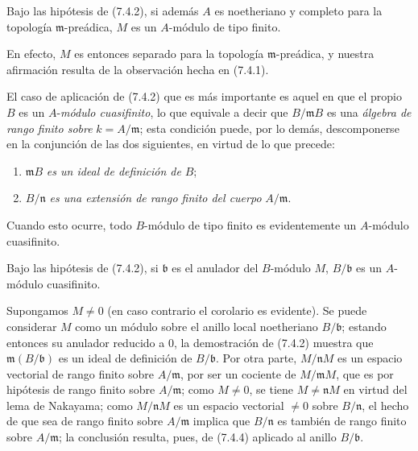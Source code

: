 \begin{corollary}[7.4.3]
\label{0.7.4.3-fr}
Bajo las hipótesis de \textup{(7.4.2)}, si además $A$ es noetheriano y completo para
la topología $\mathfrak m$-preádica, $M$ es un $A$-módulo de tipo finito.
\end{corollary}

En efecto, $M$ es entonces separado para la topología $\mathfrak m$-preádica, y
nuestra afirmación resulta de la observación hecha en (7.4.1).

\begin{env}[7.4.4]
\label{0.7.4.4-fr}
El caso de aplicación de (7.4.2) que es más importante es aquel en que el propio $B$
es un $A$-\emph{módulo cuasifinito}, lo que equivale a decir que
$B/\mathfrak mB$ es una \emph{álgebra de rango finito sobre}
$k=A/\mathfrak m$; esta condición puede, por lo demás, descomponerse en la
conjunción de las dos siguientes, en virtud de lo que precede:
\begin{enumerate}
  \item[(i)] $\mathfrak mB$ \emph{es un ideal de definición de} $B$;
  \item[(ii)] $B/\mathfrak n$ \emph{es una extensión de rango finito del cuerpo}
  $A/\mathfrak m$.
\end{enumerate}

Cuando esto ocurre, todo $B$-módulo de tipo finito es evidentemente un
$A$-módulo cuasifinito.
\end{env}

\begin{corollary}[7.4.5]
\label{0.7.4.5-fr}
Bajo las hipótesis de \textup{(7.4.2)}, si $\mathfrak b$ es el anulador del
$B$-módulo $M$, $B/\mathfrak b$ es un $A$-módulo cuasifinito.
\end{corollary}

Supongamos $M\neq0$ (en caso contrario el corolario es evidente). Se puede considerar $M$
como un módulo sobre el anillo local noetheriano $B/\mathfrak b$; estando entonces su anulador
reducido a $0$, la demostración de (7.4.2) muestra que
$\mathfrak m(B/\mathfrak b)$ es un ideal de definición de
$B/\mathfrak b$. Por otra parte, $M/\mathfrak nM$ es un espacio vectorial de
rango finito sobre $A/\mathfrak m$, por ser un cociente de $M/\mathfrak mM$, que es
por hipótesis de rango finito sobre $A/\mathfrak m$; como $M\neq0$, se tiene
$M\neq\mathfrak nM$ en virtud del lema de Nakayama; como
$M/\mathfrak nM$ es un espacio vectorial $\neq0$ sobre $B/\mathfrak n$, el hecho
de que sea de rango finito sobre $A/\mathfrak m$ implica que $B/\mathfrak n$ es
también de rango finito sobre $A/\mathfrak m$; la conclusión resulta, pues, de (7.4.4)
aplicado al anillo $B/\mathfrak b$.

